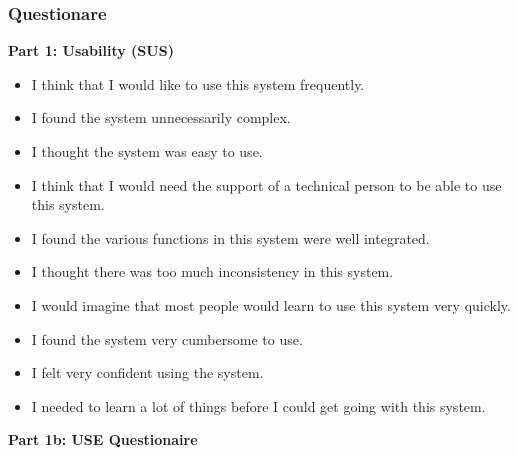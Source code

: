 \documentclass{article}
\begin{document}
\begin{itemize}
\begin{itemize}
    \subsubsection{Questionare}
        \textbf{Part 1: Usability (SUS)} %
        \begin{itemize}
            \item I think that I would like to use this system frequently.
            \item I found the system unnecessarily complex.
            \item I thought the system was easy to use.
            \item I think that I would need the support of a technical person to be able to use this system.
            \item I found the various functions in this system were well integrated.
            \item I thought there was too much inconsistency in this system.
            \item I would imagine that most people would learn to use this system very quickly.
            \item I found the system very cumbersome to use.
            \item I felt very confident using the system.
            \item I needed to learn a lot of things before I could get going with this system.
        \end{itemize}
        \textbf{Part 1b: USE Questionaire} %


\end{itemize}
\end{itemize}
\end{document}
